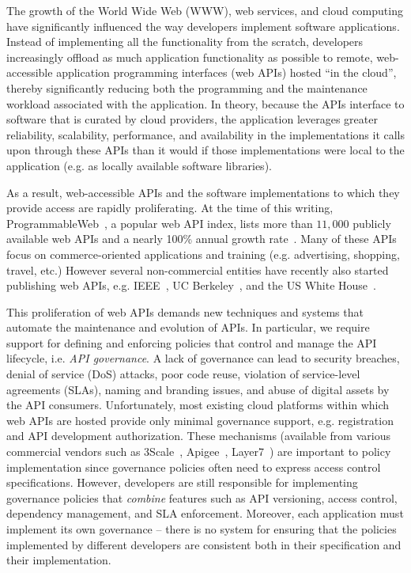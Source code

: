 The growth of the World Wide Web (WWW), web services, and cloud computing have
significantly influenced the way developers implement software applications.
Instead of implementing all the functionality from the scratch, developers
increasingly offload as much application functionality as possible to remote,
web-accessible application programming interfaces (web APIs) hosted ``in the
cloud'', thereby significantly reducing both the programming and
the maintenance workload associated with the application.  In theory, because
the APIs interface to software that is curated by cloud providers, the
application leverages greater
reliability, scalability, performance, 
and availability in the implementations it calls upon through these APIs than
it would if those implementations were local to the application
(e.g. as locally available software libraries).

As a result, web-accessible APIs and the software implementations to which
they provide access are rapidly proliferating.
At the time of this writing, 
ProgrammableWeb~\cite{pweb}, a popular web API index, lists more than $11,000$
publicly available
web APIs and a nearly 100\% annual growth rate~\cite{pweb_growth}. 
Many of these APIs focus on commerce-oriented applications and training (e.g.
advertising, shopping, travel, etc.)
However several non-commercial entities have recently
also started publishing web 
APIs, e.g. IEEE~\cite{ieeeapis}, UC Berkeley~\cite{ucbapis}, and the US White
House~\cite{whitehouseapis}.  

This proliferation of web APIs demands new techniques and systems that
automate the maintenance and evolution of APIs. In particular, we require
support for defining and enforcing policies that control and manage the API 
lifecycle, i.e. \textit{API governance}.  A lack of governance can lead to 
security breaches, denial of service (DoS)
attacks, poor code reuse, violation of service-level agreements (SLAs), 
naming and branding issues, and abuse of digital 
assets by the API consumers. Unfortunately, most existing cloud platforms
within which web APIs are hosted provide only minimal governance support, e.g.
registration and API development authorization.  These mechanisms
(available from various commercial vendors such as
3Scale~\cite{3scale}, Apigee~\cite{apigee},
Layer7~\cite{layer7})
are important to policy implementation since governance policies often need to
express access control specifications.  
However, developers are still responsible for implementing governance policies
that {\em combine} features such as API versioning, access control,
dependency management, and SLA enforcement.  Moreover, each application must
implement its own governance -- there is no system for ensuring that the
policies implemented by different developers are consistent both in their
specification and their implementation.

